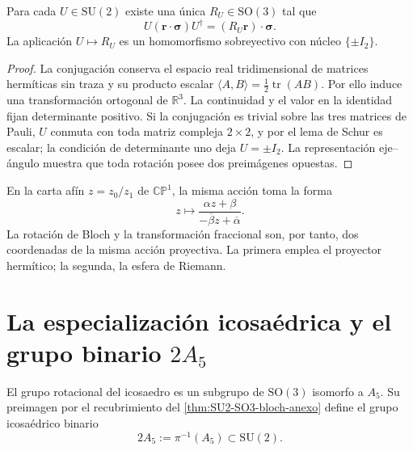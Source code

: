 \begin{theorem}
\label{thm:SU2-SO3-bloch-anexo}
Para cada \(U\in\mathrm{SU}(2)\) existe una única
\(R_U\in\mathrm{SO}(3)\) tal que
\begin{equation}
 U(\boldsymbol r\cdot\boldsymbol\sigma)U^\dagger
 =(R_U\boldsymbol r)\cdot\boldsymbol\sigma.
 \label{eq:accion-SU2-bloch-anexo}
\end{equation}
La aplicación \(U\mapsto R_U\) es un homomorfismo sobreyectivo con núcleo
\(\{\pm I_2\}\).
\end{theorem}

\begin{proof}
La conjugación conserva el espacio real tridimensional de matrices hermíticas
sin traza y su producto escalar
\(\langle A,B\rangle=\tfrac12\operatorname{tr}(AB)\). Por ello induce una
transformación ortogonal de \(\mathbb R^3\). La continuidad y el valor en la
identidad fijan determinante positivo. Si la conjugación es trivial sobre las
tres matrices de Pauli, \(U\) conmuta con toda matriz compleja \(2\times2\),
y por el lema de Schur es escalar; la condición de determinante uno deja
\(U=\pm I_2\). La representación eje--ángulo muestra que toda rotación posee
dos preimágenes opuestas.
\end{proof}

En la carta afín \(z=z_0/z_1\) de \(\mathbb{CP}^{1}\), la misma acción toma
la forma
\begin{equation}
 z\longmapsto
 \frac{\alpha z+\beta}
      {-\overline\beta z+\overline\alpha}.
 \label{eq:mobius-SU2-anexo}
\end{equation}
La rotación de Bloch y la transformación fraccional son, por tanto, dos
coordenadas de la misma acción proyectiva. La primera emplea el proyector
hermítico; la segunda, la esfera de Riemann.

\section{La especialización icosaédrica y el grupo binario \texorpdfstring{\(2A_5\)}{2A5}}

El grupo rotacional del icosaedro es un subgrupo de
\(\mathrm{SO}(3)\) isomorfo a \(A_5\). Su preimagen por el recubrimiento del
\cref{thm:SU2-SO3-bloch-anexo} define el grupo icosaédrico binario
\begin{equation}
 2A_5:=\pi^{-1}(A_5)\subset\mathrm{SU}(2).
 \label{eq:def-2A5-anexo}
\end{equation}

